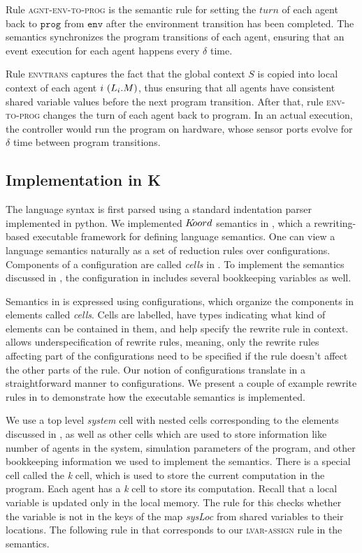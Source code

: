 Rule \textsc{agnt-env-to-prog} is the semantic rule for setting the $\mathit{turn}$ of each agent back to $\mathtt{prog}$ from $\mathtt{env}$ after the environment transition has been completed. The semantics synchronizes the program transitions of each agent, ensuring that an event execution for each agent happens every $\delta$ time.
    
Rule \textsc{envtrans} captures the fact that the global context $S$ is copied into local context of each agent $i \ (L_{i}.M)$, thus ensuring that all agents have consistent shared variable values before the next program transition. After that, rule \textsc{env-to-prog} changes the turn of each agent back to program. In an actual execution, the controller  would run the program on hardware, whose sensor ports evolve for $\delta$ time between program transitions. 

\subsection{Implementation in K}

The language syntax is first parsed using a standard indentation parser implemented in python. We implemented $K\kern-2pt oord$ semantics in \K, which a rewriting-based executable framework for defining language semantics. One can view a language semantics naturally as a set of reduction rules over configurations. Components of a configuration are called {\em cells} in \K. To implement the semantics discussed in , the configuration in \K includes several bookkeeping variables as well. 


Semantics in \K is expressed using configurations, which organize the components in elements called {\em cells}. Cells are labelled, have types indicating what kind of elements can be contained in them, and help specify the rewrite rule in context. \K allows underspecification of rewrite rules, meaning, only the rewrite rules affecting part of the configurations need to be specified if the rule doesn't affect the other parts of the rule. Our notion of configurations translate in a straightforward manner to \K configurations. We present a couple of example rewrite rules in \K to demonstrate how the executable semantics is implemented.  


We use a top level {\em system} cell with nested cells corresponding to the elements discussed in , as well as other cells which are used to store information like number of agents in the system, simulation parameters of the program, and other bookkeeping information we used to implement the semantics. There is a special cell called the {\em k} cell, which is used to store the current computation in the program. Each agent has a {\em k} cell to store its computation. Recall that a local variable is updated only in the local memory. The rule for this checks whether the variable is not in the keys of the map {\em sysLoc} from shared variables to their locations. The following rule in \K that corresponds to our \textsc{lvar-assign} rule in the semantics. 

